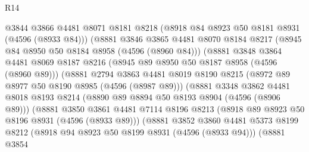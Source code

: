 \begin{lexlean}{R14}
\begin{coremodule}
                            @3844
                            @3866
                            @4481
                            @8071
                            @8181
                            @8218
                            (@8918 @84 @8923 @50 @8181 @8931 (@4596 (@8933 @84)))
                            (@8881
                              @3846
                              @3865
                              @4481
                              @8070
                              @8184
                              @8217
                              (@8945 @84 @8950 @50 @8184 @8958 (@4596 (@8960 @84)))
                              (@8881
                                @3848
                                @3864
                                @4481
                                @8069
                                @8187
                                @8216
                                (@8945 @89 @8950 @50 @8187 @8958 (@4596 (@8960 @89)))
                                (@8881
                                  @2794
                                  @3863
                                  @4481
                                  @8019
                                  @8190
                                  @8215
                                  (@8972 @89 @8977 @50 @8190 @8985 (@4596 (@8987 @89)))
                                  (@8881
                                    @3348
                                    @3862
                                    @4481
                                    @8018
                                    @8193
                                    @8214
                                    (@8890 @89 @8894 @50 @8193 @8904 (@4596 (@8906 @89)))
                                    (@8881
                                      @3850
                                      @3861
                                      @4481
                                      @7114
                                      @8196
                                      @8213
                                      (@8918 @89 @8923 @50 @8196 @8931 (@4596 (@8933 @89)))
                                      (@8881
                                        @3852
                                        @3860
                                        @4481
                                        @5373
                                        @8199
                                        @8212
                                        (@8918 @94 @8923 @50 @8199 @8931 (@4596 (@8933 @94)))
                                        (@8881
                                          @3854

\end{coremodule}
\end{lexlean}
